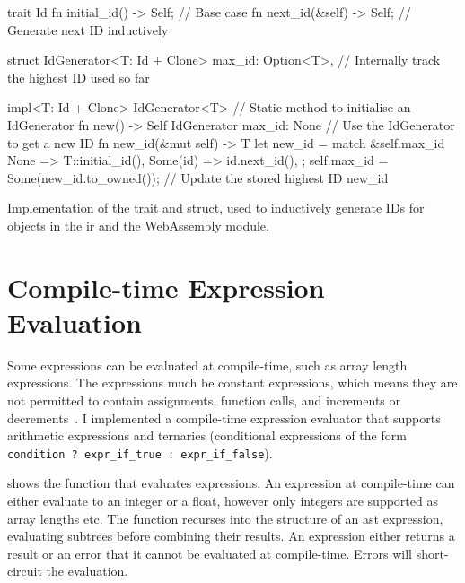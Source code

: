\documentclass[../00-main.tex]{subfiles}
\begin{document}
\FloatBarrier

\begin{listing}[!t]
  \begin{RustListing}
    trait Id {
        fn initial_id() -> Self;   // Base case
        fn next_id(&self) -> Self; // Generate next ID inductively
    }

    struct IdGenerator<T: Id + Clone> {
        max_id: Option<T>,         // Internally track the highest ID used so far
    }

    impl<T: Id + Clone> IdGenerator<T> {
        // Static method to initialise an IdGenerator
        fn new() -> Self {
            IdGenerator { max_id: None }
        }
        // Use the IdGenerator to get a new ID
        fn new_id(&mut self) -> T {
            let new_id = match &self.max_id {
                None => T::initial_id(),
                Some(id) => id.next_id(),
            };
            self.max_id = Some(new_id.to_owned()); // Update the stored highest ID
            new_id
        }
    }
  \end{RustListing}
  \caption{Implementation of the  trait and  struct, used to inductively generate IDs for objects in the \acrlong{ir} and the WebAssembly module.}
  \label{lst:Id and IdGenerator implementation}
\end{listing}


\section{Compile-time Expression Evaluation}\label{app:sec:compile time expression evaluation}

Some expressions can be evaluated at compile-time, such as array length expressions.
The expressions much be constant expressions, which means they are not permitted to contain assignments, function calls, and increments or decrements~.
I implemented a compile-time expression evaluator that supports arithmetic expressions and ternaries (conditional expressions of the form \texttt{condition~?~expr_if_true~:~expr_if_false}).

 shows the function that evaluates expressions.
An expression at compile-time can either evaluate to an integer or a float, however only integers are supported as array lengths etc.
The  function recurses into the structure of an \gls{ast} expression, evaluating subtrees before combining their results.
An expression either returns a result or an error that it cannot be evaluated at compile-time.
Errors will short-circuit the evaluation.
\end{document}
